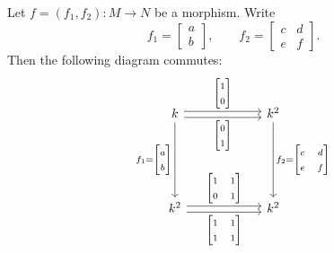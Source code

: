 \documentclass[11pt, a4paper]{report}
\begin{document}
\begin{example}
    Let $f=(f_1,f_2):M \to N$ be a morphism. Write
    \[
        f_1=\begin{bmatrix}a\\b\end{bmatrix},
        \qquad
        f_2=\begin{bmatrix}c&d\\e&f\end{bmatrix}.
    \]
    Then the following diagram commutes:
    \[
        \begin{tikzcd}[ampersand replacement=\&, column sep=6em, row sep=6em]
            k \arrow[r, "{\begin{bmatrix}1\\0\end{bmatrix}}", shift left] \arrow[d, "f_1={\begin{bmatrix}a\\b\end{bmatrix}}"'] \arrow[r, "{\begin{bmatrix}0\\1\end{bmatrix}}"', shift right] \& k^2 \arrow[d, "f_2={\begin{bmatrix}c&d\\e&f\end{bmatrix}    }"] \\
            k^2 \arrow[r, "{\begin{bmatrix}1 & 1\\0 & 1\end{bmatrix}}", shift left] \arrow[r, "{\begin{bmatrix}1 & 1\\1 & 1\end{bmatrix}}"', shift right]                                  \& k^2
        \end{tikzcd}
    \]



\end{example}
\end{document}
